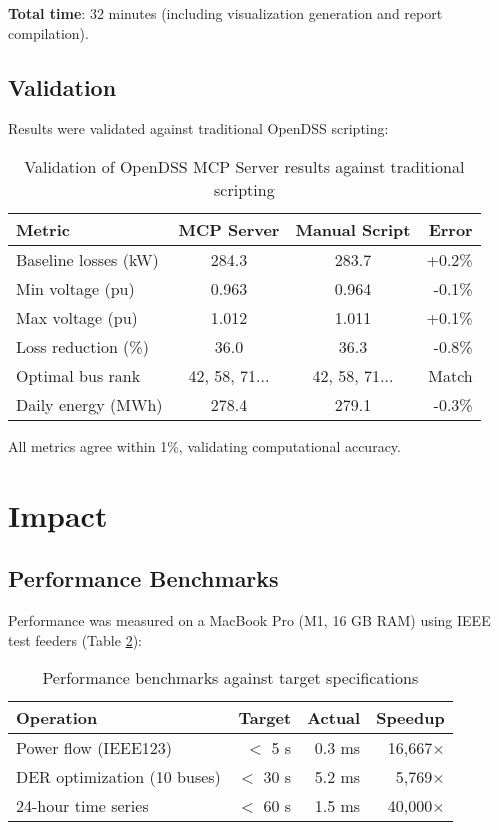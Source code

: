 \documentclass[review]{elsarticle}
\begin{document}
\textbf{Total time}: 32 minutes (including visualization generation and report compilation).

\subsection{Validation}

Results were validated against traditional OpenDSS scripting:

\begin{table}[ht]
\centering
\caption{Validation of OpenDSS MCP Server results against traditional scripting}
\label{tab:validation}
\begin{tabular}{@{}lccr@{}}
\toprule
\textbf{Metric} & \textbf{MCP Server} & \textbf{Manual Script} & \textbf{Error} \\
\midrule
Baseline losses (kW) & 284.3 & 283.7 & +0.2\% \\
Min voltage (pu) & 0.963 & 0.964 & -0.1\% \\
Max voltage (pu) & 1.012 & 1.011 & +0.1\% \\
Loss reduction (\%) & 36.0 & 36.3 & -0.8\% \\
Optimal bus rank & 42, 58, 71... & 42, 58, 71... & Match \\
Daily energy (MWh) & 278.4 & 279.1 & -0.3\% \\
\bottomrule
\end{tabular}
\end{table}

All metrics agree within 1\%, validating computational accuracy.

\section{Impact}
\label{sec:impact}

\subsection{Performance Benchmarks}

Performance was measured on a MacBook Pro (M1, 16 GB RAM) using IEEE test feeders (Table \ref{tab:performance}):

\begin{table}[ht]
\centering
\caption{Performance benchmarks against target specifications}
\label{tab:performance}
\begin{tabular}{@{}lrrr@{}}
\toprule
\textbf{Operation} & \textbf{Target} & \textbf{Actual} & \textbf{Speedup} \\
\midrule
Power flow (IEEE123) & $<$ 5 s & 0.3 ms & 16,667$\times$ \\
DER optimization (10 buses) & $<$ 30 s & 5.2 ms & 5,769$\times$ \\
24-hour time series & $<$ 60 s & 1.5 ms & 40,000$\times$ \\
\bottomrule
\end{tabular}
\end{table}
\end{document}
